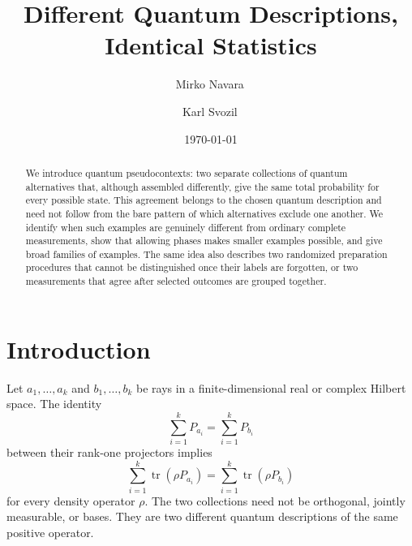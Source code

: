 \documentclass[
  twocolumn,
  aps,
  pra,
  floatfix,
  amsmath,amssymb,
  longbibliography
]{revtex4-2}
\theoremstyle{definition}
\theoremstyle{remark}
\newcommand{\Tr}{\operatorname{tr}}
\newcommand{\1}{\mathbf 1}
\begin{document}
\title{Different Quantum Descriptions, Identical Statistics}

\author{Mirko Navara\,}

\author{Karl Svozil\,}

\date{\today}

\begin{abstract}
We introduce quantum pseudocontexts: two separate collections of quantum
alternatives that, although assembled differently, give the same total
probability for every possible state.  This agreement belongs to the chosen
quantum description and need not follow from the bare pattern of which
alternatives exclude one another.  We identify when such examples are
genuinely different from ordinary complete measurements, show that allowing
phases makes smaller examples possible, and give broad families of examples.
The same idea also describes two randomized preparation procedures that cannot
be distinguished once their labels are forgotten, or two measurements that
agree after selected outcomes are grouped together.
\end{abstract}

\maketitle

\section{Introduction}

Let $a_1,\ldots,a_k$ and $b_1,\ldots,b_k$ be rays in a finite-dimensional
real or complex Hilbert space.  The identity
\begin{equation}
 \sum_{i=1}^{k}P_{a_i}=\sum_{i=1}^{k}P_{b_i}
 \label{eq:intro-operator}
\end{equation}
between their rank-one projectors implies
\begin{equation}
 \sum_{i=1}^{k}\Tr(\rho P_{a_i})
 =\sum_{i=1}^{k}\Tr(\rho P_{b_i})
 \label{eq:intro-probability}
\end{equation}
for every density operator $\rho$.  The two collections need not be
orthogonal, jointly measurable, or bases.  They are two different quantum
descriptions of the same positive operator.
\end{document}
